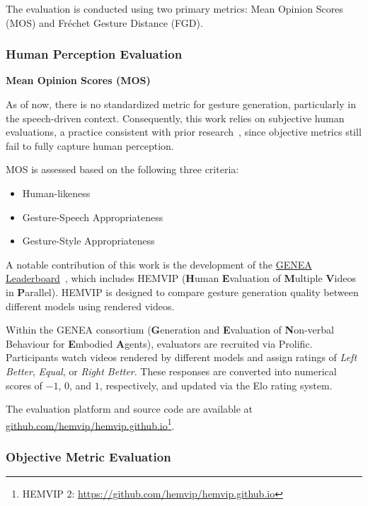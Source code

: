 The evaluation is conducted using two primary metrics: Mean Opinion Scores (MOS) and Fréchet Gesture Distance (FGD).

\subsubsection{Human Perception Evaluation}

\textbf{Mean Opinion Scores (MOS)}

As of now, there is no standardized metric for gesture generation, particularly in the speech-driven context. Consequently, this work relies on subjective human evaluations, a practice consistent with prior research~\cite{yoon2022genea, kucherenko2021large, alexanderson2022listen}, since objective metrics still fail to fully capture human perception.

MOS is assessed based on the following three criteria:

\begin{itemize}
	\item Human-likeness
	\item Gesture-Speech Appropriateness
	\item Gesture-Style Appropriateness
\end{itemize}

A notable contribution of this work is the development of the \hyperlink{https://genea-workshop.github.io/leaderboard/}{GENEA Leaderboard}~\cite{nagy2024towards}, which includes HEMVIP (\textbf{H}uman \textbf{E}valuation of \textbf{M}ultiple \textbf{V}ideos in \textbf{P}arallel). HEMVIP is designed to compare gesture generation quality between different models using rendered videos.

Within the GENEA consortium (\textbf{G}eneration and \textbf{E}valuation of \textbf{N}on-verbal Behaviour for \textbf{E}mbodied \textbf{A}gents), evaluators are recruited via Prolific. Participants watch videos rendered by different models and assign ratings of \textit{Left Better}, \textit{Equal}, or \textit{Right Better}. These responses are converted into numerical scores of $-1$, $0$, and $1$, respectively, and updated via the Elo rating system.

The evaluation platform and source code are available at \hyperlink{https://github.com/hemvip/hemvip.github.io/}{github.com/hemvip/hemvip.github.io}\footnote{HEMVIP 2: \url{https://github.com/hemvip/hemvip.github.io}}.

\subsubsection{Objective Metric Evaluation}

